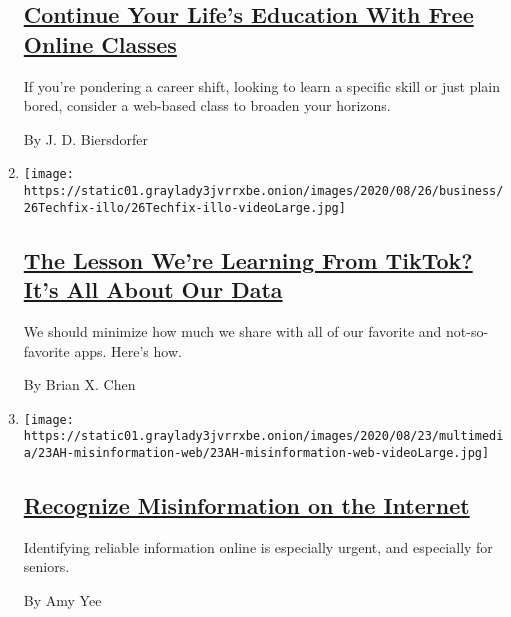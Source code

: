 \begin{enumerate}
  \hypertarget{continue-your-lifes-education-with-free-online-classes}{%
  \subsection{\texorpdfstring{\href{/2020/09/09/technology/personaltech/education-free-online-classes.html}{Continue
  Your Life's Education With Free Online
  Classes}}{Continue Your Life's Education With Free Online Classes}}\label{continue-your-lifes-education-with-free-online-classes}}

  If you're pondering a career shift, looking to learn a specific skill
  or just plain bored, consider a web-based class to broaden your
  horizons.

  By J. D. Biersdorfer
\item
  \texttt{[image: https://static01.graylady3jvrrxbe.onion/images/2020/08/26/business/26Techfix-illo/26Techfix-illo-videoLarge.jpg]}

  \hypertarget{the-lesson-were-learning-from-tiktok-its-all-about-our-data}{%
  \subsection{\texorpdfstring{\href{/2020/08/26/technology/personaltech/tiktok-data-apps.html}{The
  Lesson We're Learning From TikTok? It's All About Our
  Data}}{The Lesson We're Learning From TikTok? It's All About Our Data}}\label{the-lesson-were-learning-from-tiktok-its-all-about-our-data}}

  We should minimize how much we share with all of our favorite and
  not-so-favorite apps. Here's how.

  By Brian X. Chen
\item
  \texttt{[image: https://static01.graylady3jvrrxbe.onion/images/2020/08/23/multimedia/23AH-misinformation-web/23AH-misinformation-web-videoLarge.jpg]}

  \hypertarget{recognize-misinformation-on-the-internet}{%
  \subsection{\texorpdfstring{\href{/2020/08/22/at-home/recognize-misinformation-internet.html}{Recognize
  Misinformation on the
  Internet}}{Recognize Misinformation on the Internet}}\label{recognize-misinformation-on-the-internet}}

  Identifying reliable information online is especially urgent, and
  especially for seniors.

  By Amy Yee
\end{enumerate}

